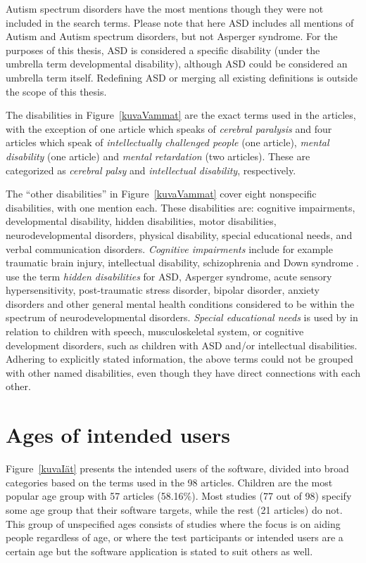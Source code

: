 \documentclass[utf8,english]{gradu3}
\begin{document}
Autism spectrum disorders have the most mentions though they were not included in the search terms.
Please note that here ASD includes all mentions of Autism and Autism spectrum disorders,
but not Asperger syndrome. For the purposes of this thesis, ASD is considered a specific disability
(under the umbrella term developmental disability),
although ASD could be considered an umbrella term itself.
Redefining ASD or merging all existing definitions is outside the scope of this thesis.

The disabilities in Figure~\ref{kuvaVammat} are the exact terms used in the articles, with the exception of
one article which speaks of \textit{cerebral paralysis} and four articles which speak of
\textit{intellectually challenged people} (one article), \textit{mental disability} (one article) and
\textit{mental retardation} (two articles). These are categorized as
\textit{cerebral palsy} and \textit{intellectual disability}, respectively.

The ``other disabilities'' in Figure~\ref{kuvaVammat} cover eight nonspecific disabilities,
with one mention each. These disabilities are:
cognitive impairments, developmental disability, hidden disabilities, motor disabilities,
neurodevelopmental disorders, physical disability, special educational needs, and verbal communication disorders.
\textit{Cognitive impairments} include for example traumatic brain injury, intellectual disability,
schizophrenia and Down syndrome \parencite{chang2012feasibility}.
\textcite{poyade2019isensevr} use the term \textit{hidden disabilities} for ASD,
Asperger syndrome, acute sensory hypersensitivity, post-traumatic stress disorder,
bipolar disorder, anxiety disorders and other general mental health conditions considered to be
within the spectrum of neurodevelopmental disorders.
\textit{Special educational needs} is used by \textcite{kraleva2017childibu} in relation to
children with speech, musculoskeletal system, or cognitive development disorders,
such as children with ASD and/or intellectual disabilities.
Adhering to explicitly stated information, the above terms could not be grouped with
other named disabilities, even though they have direct connections with each other.


\section{Ages of intended users} %

Figure~\ref{kuvaIät} presents the intended users of the software, divided into broad categories
based on the terms used in the 98 articles.
Children are the most popular age group with 57 articles (58.16\%).
Most studies (77 out of 98) specify some age group that their software targets,
while the rest (21 articles) do not. This group of unspecified ages consists
of studies where the focus is on aiding people regardless of age,
or where the test participants or intended users are a certain age
but the software application is stated to suit others as well.
\end{document}
